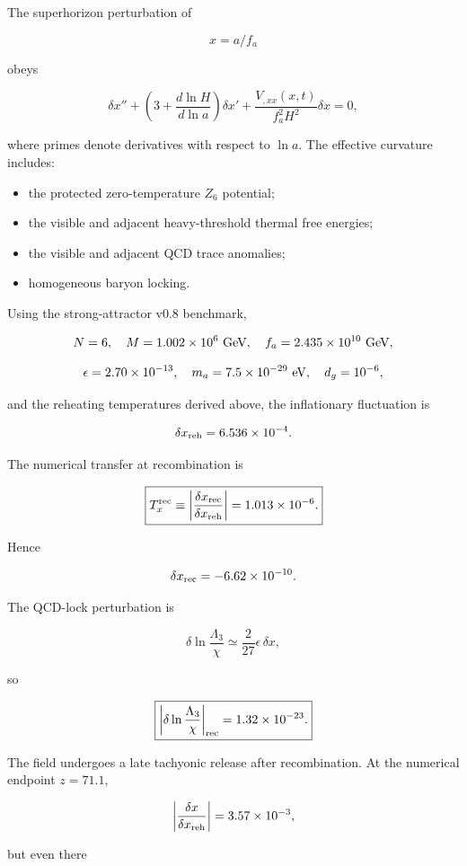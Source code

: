 \documentclass[
  10pt,
]{article}
\providecommand{\tightlist}{%
  \setlength{\itemsep}{0pt}\setlength{\parskip}{0pt}}
\begin{document}
The superhorizon perturbation of

\[
x=a/f_a
\]

obeys

\[
\delta x''
+
\left(3+\frac{d\ln H}{d\ln a}\right)\delta x'
+
\frac{V_{,xx}(x,t)}{f_a^2H^2}\delta x
=0,
\]

where primes denote derivatives with respect to \(\ln a\). The effective
curvature includes:

\begin{itemize}
\tightlist
\item
  the protected zero-temperature \(Z_6\) potential;
\item
  the visible and adjacent heavy-threshold thermal free energies;
\item
  the visible and adjacent QCD trace anomalies;
\item
  homogeneous baryon locking.
\end{itemize}

Using the strong-attractor v0.8 benchmark,

\[
N=6,
\quad
M=1.002\times10^6\ {\rm GeV},
\quad
f_a=2.435\times10^{10}\ {\rm GeV},
\]

\[
\epsilon=2.70\times10^{-13},
\quad
m_a=7.5\times10^{-29}\ {\rm eV},
\quad
d_g=10^{-6},
\]

and the reheating temperatures derived above, the inflationary
fluctuation is

\[
\delta x_{\rm reh}
=
6.536\times10^{-4}.
\]

The numerical transfer at recombination is

\[
\boxed{
T_x^{\rm rec}
\equiv
\left|\frac{\delta x_{\rm rec}}{\delta x_{\rm reh}}\right|
=1.013\times10^{-6}.
}
\]

Hence

\[
\delta x_{\rm rec}
=-6.62\times10^{-10}.
\]

The QCD-lock perturbation is

\[
\delta\ln\frac{\Lambda_3}{\chi}
\simeq
\frac{2}{27}\epsilon\,\delta x,
\]

so

\[
\boxed{
\left|\delta\ln\frac{\Lambda_3}{\chi}\right|_{\rm rec}
=1.32\times10^{-23}.
}
\]

The field undergoes a late tachyonic release after recombination. At the
numerical endpoint \(z=71.1\),

\[
\left|\frac{\delta x}{\delta x_{\rm reh}}\right|
=3.57\times10^{-3},
\]

but even there
\end{document}
